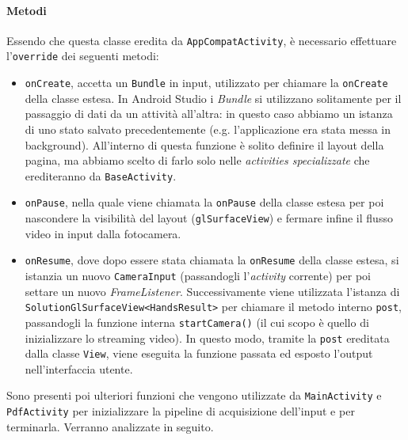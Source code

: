 \paragraph{Metodi} Essendo che questa classe eredita da \texttt{AppCompatActivity}, è necessario effettuare l'\texttt{override} dei seguenti metodi:
\begin{itemize}
    \item \texttt{onCreate}, accetta un \texttt{Bundle} in input, utilizzato per chiamare la \texttt{onCreate} della classe estesa. In Android Studio i \textit{Bundle} si utilizzano solitamente per il passaggio di dati da un attività all'altra: in questo caso abbiamo un istanza di uno stato salvato precedentemente (e.g. l'applicazione era stata messa in background). All'interno di questa funzione è solito definire il layout della pagina, ma abbiamo scelto di farlo solo nelle \textit{activities specializzate} che erediteranno da \texttt{BaseActivity}.
    \item \texttt{onPause}, nella quale viene chiamata la \texttt{onPause} della classe estesa per poi nascondere la visibilità del layout (\texttt{glSurfaceView}) e fermare infine il flusso video in input dalla fotocamera.
    \item \texttt{onResume}, dove dopo essere stata chiamata la \texttt{onResume} della classe estesa, si istanzia un nuovo \texttt{CameraInput} (passandogli l'\textit{activity} corrente) per poi settare un nuovo \textit{FrameListener}. Successivamente viene utilizzata l'istanza di \texttt{SolutionGlSurfaceView<HandsResult>} per chiamare il metodo interno \texttt{post}, passandogli la funzione interna \texttt{startCamera()} (il cui scopo è quello di inizializzare lo streaming video). In questo modo, tramite la \texttt{post} ereditata dalla classe \texttt{View}, viene eseguita la funzione passata ed esposto l'output nell'interfaccia utente.
\end{itemize}
\noindent Sono presenti poi ulteriori funzioni che vengono utilizzate da \texttt{MainActivity} e \texttt{PdfActivity} per inizializzare la pipeline di acquisizione dell'input e per terminarla. Verranno analizzate in seguito.



